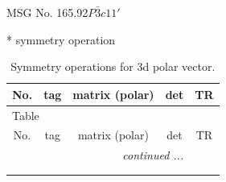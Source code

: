 \documentclass[fleqn,8pt]{jsarticle}
\begin{document}
\setcounter{MaxMatrixCols}{32}

\renewcommand{\tablename}{Table~}
\renewcommand{\figurename}{Figure~}
\begin{center}
\LARGE
MSG No. 165.92\quad$P\bar{3}c11'$
\end{center}
* symmetry operation
\renewcommand{\arraystretch}{1.3}
\begin{longtable}{ccccc}
\caption{Symmetry operations for 3d polar vector.}
 \\
 \hline \hline
No. & tag & matrix (polar) & det & TR \\ \hline \endfirsthead

\multicolumn{4}{l}{\tablename\ \thetable{}} \\
 \hline \hline
No. & tag & matrix (polar) & det & TR \\ \hline \endhead

 \hline \hline
\multicolumn{4}{r}{\footnotesize\it continued ...} \\ \endfoot

 \hline \hline
\multicolumn{4}{r}{} \\ \endlastfoot


\end{longtable}
\end{document}
